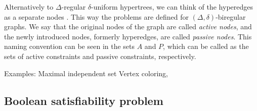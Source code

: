 Alternatively to $\Delta$-regular $\delta$-uniform hypertrees, we can think of the hyperedges as a separate nodes \cite{DBLP:conf/podc/Olivetti20}.
This way the problems are defined for $(\Delta, \delta)$-biregular graphs.
We say that the original nodes of the graph are called \emph{active nodes}, and the newly introduced nodes, formerly hyperedges, are called \emph{passive nodes}.
This naming convention can be seen in the sets $A$ and $P$, which can be called as the sets of active constraints and passive constraints, respectively.












Examples:
Maximal independent set
Vertex coloring,

\subsection{Boolean satisfiability problem}


\clearpage

